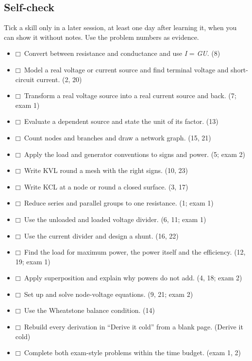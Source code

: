 \documentclass[11pt]{article}
\begin{document}
\begin{keepsection}
\section{Self-check}

Tick a skill only in a later session, at least one day after learning it, when you can show it without notes. Use the problem numbers as evidence.

\begin{itemize}
\item $\mdlgwhtsquare$\ Convert between resistance and conductance and use \textit{I} = \textit{GU}. (8)
\item $\mdlgwhtsquare$\ Model a real voltage or current source and find terminal voltage and short-circuit current. (2, 20)
\item $\mdlgwhtsquare$\ Transform a real voltage source into a real current source and back. (7; exam 1)
\item $\mdlgwhtsquare$\ Evaluate a dependent source and state the unit of its factor. (13)
\item $\mdlgwhtsquare$\ Count nodes and branches and draw a network graph. (15, 21)
\item $\mdlgwhtsquare$\ Apply the load and generator conventions to signs and power. (5; exam 2)
\item $\mdlgwhtsquare$\ Write KVL round a mesh with the right signs. (10, 23)
\item $\mdlgwhtsquare$\ Write KCL at a node or round a closed surface. (3, 17)
\item $\mdlgwhtsquare$\ Reduce series and parallel groups to one resistance. (1; exam 1)
\item $\mdlgwhtsquare$\ Use the unloaded and loaded voltage divider. (6, 11; exam 1)
\item $\mdlgwhtsquare$\ Use the current divider and design a shunt. (16, 22)
\item $\mdlgwhtsquare$\ Find the load for maximum power, the power itself and the efficiency. (12, 19; exam 1)
\item $\mdlgwhtsquare$\ Apply superposition and explain why powers do not add. (4, 18; exam 2)
\item $\mdlgwhtsquare$\ Set up and solve node-voltage equations. (9, 21; exam 2)
\item $\mdlgwhtsquare$\ Use the Wheatstone balance condition. (14)
\item $\mdlgwhtsquare$\ Rebuild every derivation in “Derive it cold” from a blank page. (Derive it cold)
\item $\mdlgwhtsquare$\ Complete both exam-style problems within the time budget. (exam 1, 2)
\end{itemize}
\end{keepsection}
\end{document}
